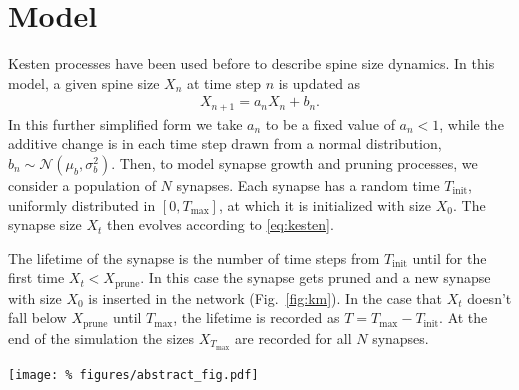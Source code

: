 
\vspace{-0.4cm}
\section*{Model}

Kesten processes have been used before \cite{Statman2014} to describe spine size dynamics. In this model, a given spine size $X_n$ at time step $n$ is updated as
%
\begin{align}
  X_{n+1} = a_n X_n + b_n. \label{eq:kesten}
\end{align}
%
In this further simplified form we take $a_n$ to be a fixed value of $a_n < 1$, while the additive change is in each time step drawn from a normal distribution, $b_n \sim \mathcal{N}(\mu_b, \sigma_b^2)$. Then, to model synapse growth and pruning processes, we consider a population of $N$ synapses. Each synapse has a random time $T_{\mathrm{init}}$, uniformly distributed in $[0,T_{\text{max}}]$, at which it is initialized with size $X_0$. The synapse size $X_t$ then evolves according to \eqref{eq:kesten}.

\medskip

The lifetime of the synapse is the number of time steps from $T_{\text{init}}$ until for the first time $X_t < X_{\mathrm{prune}}$. In this case the synapse gets pruned and a new synapse with size $X_0$ is inserted in the network (Fig.~\ref{fig:km}). In the case that $X_t$ doesn't fall below $X_{\mathrm{prune}}$ until $T_{\text{max}}$, the lifetime is recorded as $T=T_{\text{max}}-T_{\text{init}}$. At the end of the simulation the sizes $X_{T_{\text{max}}}$ are recorded for all $N$ synapses.

\begin{center}\vspace{1cm}
  \texttt{[image: \%
    figures/abstract\_fig.pdf]}
  \label{fig:km}
\end{center}\vspace{1.4cm}
